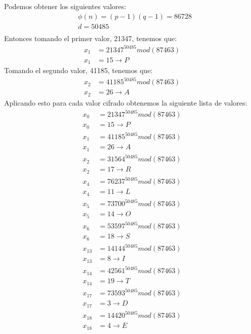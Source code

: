 \documentclass[12pt, letterpaper]{article}
\begin{document}
\begin{itemize}
Podemos obtener los siguientes valores:
\begin{equation*}
\begin{split}
&\phi(n) = (p-1)(q-1) = 86728\\
&d = 50485\\
\end{split}
\end{equation*}
Entonces tomando el primer valor, 21347, tenemos que:
\begin{equation*}
\begin{split}
x_1	&= 21347^{50485} mod (87463)\\
x_1	&= 15 \rightarrow P
\end{split}
\end{equation*}
Tomando el segundo valor, 41185, tenemos que: 
\begin{equation*}
\begin{split}
x_2	&= 41185^{50485} mod (87463)\\
x_2	&= 26 \rightarrow A
\end{split}
\end{equation*}
Aplicando esto para cada valor cifrado obtenemos la siguiente lista de valores:
\begin{equation*}
\begin{split}
x_{0}&=21347^{50485} mod (87463)\\x_{0}&=15\rightarrow P\\
x_{1}&=41185^{50485} mod (87463)\\x_{1}&=26\rightarrow A\\
x_{2}&=31564^{50485} mod (87463)\\x_{2}&=17\rightarrow R\\
x_{4}&=76237^{50485} mod (87463)\\x_{4}&=11\rightarrow L\\
x_{5}&=73700^{50485} mod (87463)\\x_{5}&=14\rightarrow O\\
x_{6}&=53597^{50485} mod (87463)\\x_{6}&=18\rightarrow S\\
x_{13}&=14144^{50485} mod (87463)\\x_{13}&=8\rightarrow I\\
x_{14}&=42561^{50485} mod (87463)\\x_{14}&=19\rightarrow T\\
x_{17}&=73593^{50485} mod (87463)\\x_{17}&=3\rightarrow D\\
x_{18}&=14420^{50485} mod (87463)\\x_{18}&=4\rightarrow E\\

\end{split}
\end{equation*}
\end{itemize}
\end{document}
